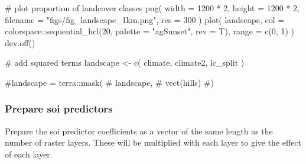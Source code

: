 \documentclass[
]{article}
\newenvironment{Shaded}{}{}
\newcommand{\CommentTok}[1]{\textcolor[rgb]{0.00,0.50,0.00}{#1}}
\newcommand{\DataTypeTok}[1]{#1}
\newcommand{\DecValTok}[1]{#1}
\newcommand{\KeywordTok}[1]{\textcolor[rgb]{0.00,0.00,1.00}{#1}}
\newcommand{\NormalTok}[1]{#1}
\newcommand{\OperatorTok}[1]{#1}
\newcommand{\StringTok}[1]{\textcolor[rgb]{0.00,0.50,0.50}{#1}}
\begin{document}
\begin{Shaded}
\begin{Highlighting}[]
\CommentTok{# plot proportion of landcover classes}
\KeywordTok{png}\NormalTok{(}
  \DataTypeTok{width =} \DecValTok{1200} \OperatorTok{*}\StringTok{ }\DecValTok{2}\NormalTok{, }\DataTypeTok{height =} \DecValTok{1200} \OperatorTok{*}\StringTok{ }\DecValTok{2}\NormalTok{, }\DataTypeTok{filename =} \StringTok{"figs/fig_landscape_1km.png"}\NormalTok{,}
  \DataTypeTok{res =} \DecValTok{300}
\NormalTok{)}
\KeywordTok{plot}\NormalTok{(}
\NormalTok{  landscape,}
  \DataTypeTok{col =}\NormalTok{ colorspace}\OperatorTok{::}\KeywordTok{sequential_hcl}\NormalTok{(}\DecValTok{20}\NormalTok{, }\DataTypeTok{palette =} \StringTok{"agSunset"}\NormalTok{, }\DataTypeTok{rev =}\NormalTok{ T),}
  \DataTypeTok{range =} \KeywordTok{c}\NormalTok{(}\DecValTok{0}\NormalTok{, }\DecValTok{1}\NormalTok{)}
\NormalTok{)}
\KeywordTok{dev.off}\NormalTok{()}
\end{Highlighting}
\end{Shaded}

\begin{Shaded}
\begin{Highlighting}[]
\CommentTok{# add squared terms}
\NormalTok{landscape <-}\StringTok{ }\KeywordTok{c}\NormalTok{(}
\NormalTok{  climate, climate2, lc_split}
\NormalTok{)}

\CommentTok{#landscape = terra::mask(}
\CommentTok{#  landscape,}
\CommentTok{#  vect(hills)}
\CommentTok{#)}
\end{Highlighting}
\end{Shaded}

\hypertarget{prepare-soi-predictors}{%
\subsubsection{Prepare soi predictors}\label{prepare-soi-predictors}}

Prepare the soi predictor coefficients as a vector of the same length as the number of raster layers.
These will be multiplied with each layer to give the effect of each layer.
\end{document}
